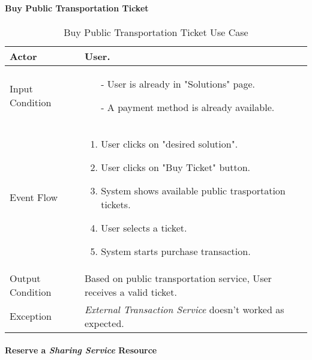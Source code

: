 	\paragraph{Buy Public Transportation Ticket} \label{buyTicket_useCase}
		\begin{table}[H]
			\begin{tabular}{| l | p{} | }
				\hline
				\hline
				Actor	&		User. \\
				\hline
				Input Condition		&		\begin{itemize}
														\item[-] User is already in "Solutions" page.
														\item[-] A payment method is already available.
													\end{itemize} \\
				\hline
				Event Flow		&		\begin{enumerate}
													\item User clicks on "desired solution".
													\item User clicks on "Buy Ticket" button.
													\item System shows available public trasportation tickets.
													\item User selects a ticket.
													\item	 System starts purchase transaction.
												\end{enumerate} \\
				\hline
				Output Condition		&		Based on public transportation service, User receives a valid ticket. \\
				\hline		
				Exception		&		\textit{External Transaction Service} doesn't worked as expected. \\
				\hline
				\hline
			\end{tabular}
			\caption{Buy Public Transportation Ticket Use Case}
		\end{table}


	\paragraph{Reserve a \textit{Sharing Service} Resource} \label{sharing_useCase}
		
